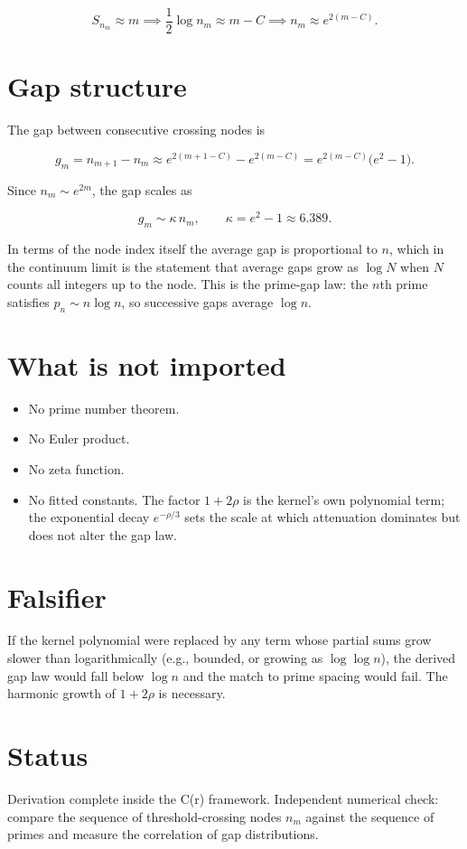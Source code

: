 \documentclass{article}
\begin{document}
\[
S_{n_m} \approx m \implies \frac{1}{2} \log n_m \approx m - C \implies n_m \approx e^{2(m - C)}.
\]

\section{Gap structure}

The gap between consecutive crossing nodes is

\[
g_m = n_{m+1} - n_m \approx e^{2(m+1-C)} - e^{2(m-C)} = e^{2(m-C)} \bigl( e^{2} - 1 \bigr).
\]

Since $n_m \sim e^{2m}$, the gap scales as

\[
g_m \sim \kappa \, n_m, \qquad \kappa = e^{2} - 1 \approx 6.389.
\]

In terms of the node index itself the average gap is proportional to $n$, which in the continuum limit is the statement that average gaps grow as $\log N$ when $N$ counts all integers up to the node. This is the prime-gap law: the $n$th prime satisfies $p_n \sim n \log n$, so successive gaps average $\log n$.

\section{What is not imported}

\begin{itemize}
    \item No prime number theorem.
    \item No Euler product.
    \item No zeta function.
    \item No fitted constants. The factor $1 + 2\rho$ is the kernel's own polynomial term; the exponential decay $e^{-\rho/3}$ sets the scale at which attenuation dominates but does not alter the gap law.
\end{itemize}

\section{Falsifier}

If the kernel polynomial were replaced by any term whose partial sums grow slower than logarithmically (e.g., bounded, or growing as $\log \log n$), the derived gap law would fall below $\log n$ and the match to prime spacing would fail. The harmonic growth of $1 + 2\rho$ is necessary.

\section{Status}

Derivation complete inside the C(r) framework. Independent numerical check: compare the sequence of threshold-crossing nodes $n_m$ against the sequence of primes and measure the correlation of gap distributions.
\end{document}
